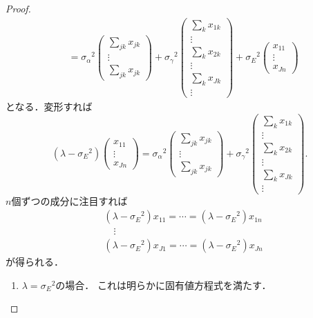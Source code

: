 \begin{proof}
\begin{align*}
    &= \sigma_\alpha{}^2
    \begin{pmatrix}
      \sum_{jk} x_{jk} \\ \vdots \\ \sum_{jk} x_{jk}
    \end{pmatrix}
    +
    \sigma_\gamma{}^2
    \begin{pmatrix}
      \sum_k x_{1k} \\ \vdots \\ \sum_k x_{2k} \\ \vdots \\ \sum_k x_{Jk} \\ \vdots
    \end{pmatrix}
    +
    \sigma_E{}^2
    \begin{pmatrix}
      x_{11} \\ \vdots \\ x_{Jn}
    \end{pmatrix}
  \end{align*}
  となる．変形すれば
  \[
  (\lambda - \sigma_E{}^2)
  \begin{pmatrix}
    x_{11} \\ \vdots \\ x_{Jn}
  \end{pmatrix}
  = \sigma_\alpha{}^2
  \begin{pmatrix}
    \sum_{jk} x_{jk} \\ \vdots \\ \sum_{jk} x_{jk}
  \end{pmatrix}
  +
  \sigma_\gamma{}^2
  \begin{pmatrix}
    \sum_k x_{1k} \\ \vdots \\ \sum_k x_{2k} \\ \vdots \\ \sum_k x_{Jk} \\ \vdots
  \end{pmatrix}
  .
  \]
  \(n\)個ずつの成分に注目すれば
  \begin{align*}
    & (\lambda - \sigma_E{}^2) x_{11} = \cdots = (\lambda - \sigma_E{}^2) x_{1n} \\
    & \quad \vdots \\
    & (\lambda - \sigma_E{}^2) x_{J1} = \cdots = (\lambda - \sigma_E{}^2) x_{Jn}
  \end{align*}
  が得られる．
  \begin{enumerate}
    \item \(\lambda = \sigma_E{}^2\)の場合．
    これは明らかに固有値方程式を満たす．

\end{enumerate}
\end{proof}
